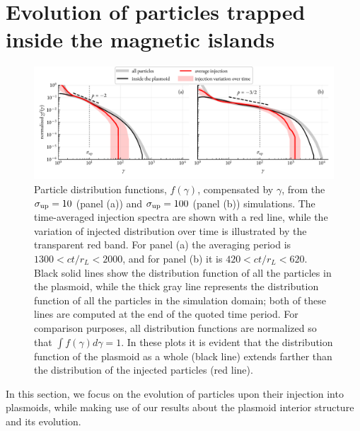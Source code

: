 %
% 
%
% 

\section{Evolution of particles trapped inside the magnetic islands}
\label{subsec:reconnection-particles_in_plasmoids}

\begin{figure}[htb]
    \centering
    \includegraphics[width=\textwidth]{figures/ch2-reconnection/fig4.pdf}
    \caption{Particle distribution functions, $f(\gamma)$, compensated by $\gamma$, from  the $\sigma_{\rm up}=10$ (panel (a)) and $\sigma_{\rm up}=100$ (panel (b)) simulations. The time-averaged injection spectra are shown with a red line, while the variation of injected distribution over time is illustrated by the transparent red band. For panel (a) the averaging period is $1300<ct/r_L<2000$, and for panel (b) it is $420 < ct/r_L < 620$. Black solid lines show the distribution function of all the particles in the plasmoid, while the thick gray line represents the distribution function of all the particles in the simulation domain; both of these lines are computed at the end of the quoted time period. For comparison purposes, all distribution functions are normalized so that $\int f(\gamma)d\gamma=1$. In these plots it is evident that the distribution function of the plasmoid as a whole (black line) extends farther than the distribution of the injected particles (red line).}
    \label{fig:rec-injspec}
\end{figure}
In this section, we focus on the evolution of particles upon their injection into plasmoids, while making use of our results about the plasmoid interior structure and its evolution.

